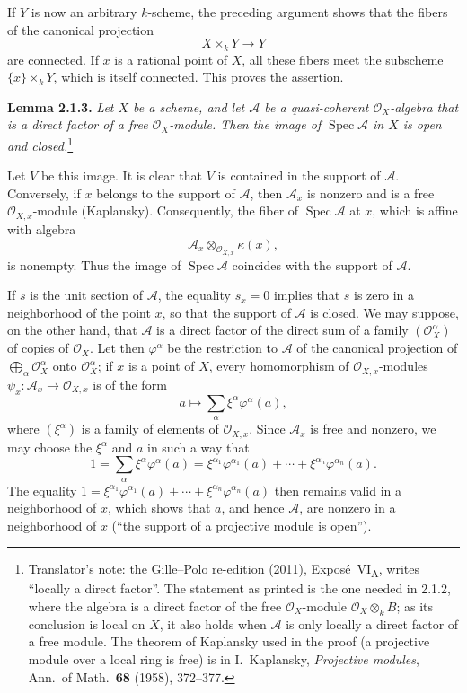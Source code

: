 If \(Y\) is now an arbitrary \(k\)-scheme, the preceding argument shows
that the fibers of the canonical projection
\[
  X\times_kY\longrightarrow Y
\]
are connected. If \(x\) is a rational point of \(X\), all these fibers
meet the subscheme \(\{x\}\times_kY\), which is itself connected. This
proves the assertion.

\medskip
{}\label{lem:sga3-VIA-2.1.3}%
\noindent\textbf{Lemma 2.1.3.}
\textit{Let \(X\) be a scheme, and let \(\mathcal A\) be a
quasi-coherent \(\mathcal O_X\)-algebra that is
a direct factor of a free \(\mathcal O_X\)-module. Then the image of
\(\operatorname{Spec}\mathcal A\) in \(X\) is open and closed.}\footnote{Translator's note: the Gille--Polo re-edition (2011),
Exposé~VI\textsubscript{A}, writes ``locally a direct factor''. The statement as printed is the one
needed in 2.1.2, where the algebra is a direct factor of the free \(\mathcal O_X\)-module
\(\mathcal O_X\otimes_kB\); as its conclusion is local on \(X\), it also holds when \(\mathcal A\) is
only locally a direct factor of a free module. The theorem of Kaplansky used in the proof (a projective
module over a local ring is free) is in I.~Kaplansky, \emph{Projective modules}, Ann.\ of Math.\
\textbf{68} (1958), 372--377.}

\medskip
Let \(V\) be this image. It is clear that \(V\) is contained in the
support of \(\mathcal A\). Conversely, if \(x\) belongs to the support of
\(\mathcal A\), then \(\mathcal A_x\) is nonzero and is a free
\(\mathcal O_{X,x}\)-module (Kaplansky). Consequently, the fiber of
\(\operatorname{Spec}\mathcal A\) at \(x\), which is affine with algebra
\[
  \mathcal A_x\otimes_{\mathcal O_{X,x}}\kappa(x),
\]
is nonempty. Thus the image of \(\operatorname{Spec}\mathcal A\)
coincides with the support of \(\mathcal A\).

If \(s\) is the unit section of \(\mathcal A\), the equality \(s_x=0\)
implies that \(s\) is zero in a neighborhood of the point \(x\), so that
the support of \(\mathcal A\) is closed. We may suppose, on the other
hand, that \(\mathcal A\) is a direct factor of the direct sum of a family
\((\mathcal O_X^\alpha)\) of copies of \(\mathcal O_X\). Let then
\(\varphi^\alpha\) be the restriction to \(\mathcal A\) of the canonical
projection of \(\bigoplus_\alpha\mathcal O_X^\alpha\) onto
\(\mathcal O_X^\alpha\); if \(x\) is a point of \(X\), every homomorphism
of \(\mathcal O_{X,x}\)-modules
\(\psi_x:\mathcal A_x\to\mathcal O_{X,x}\) is of the form
\[
  a\longmapsto\sum_\alpha\xi^\alpha\varphi^\alpha(a),
\]
where \((\xi^\alpha)\) is a family of elements of \(\mathcal O_{X,x}\).
Since \(\mathcal A_x\) is free and nonzero, we may choose the
\(\xi^\alpha\) and \(a\) in such a way that
\[
  1=\sum_\alpha\xi^\alpha\varphi^\alpha(a)
   =\xi^{\alpha_1}\varphi^{\alpha_1}(a)
    +\cdots+
    \xi^{\alpha_n}\varphi^{\alpha_n}(a).
\]
The equality
\(1=\xi^{\alpha_1}\varphi^{\alpha_1}(a)+\cdots+\xi^{\alpha_n}\varphi^{\alpha_n}(a)\)
then remains valid in a neighborhood of \(x\), which shows that \(a\),
and hence \(\mathcal A\), are nonzero in a neighborhood of \(x\)
(``the support of a projective module is open'').

